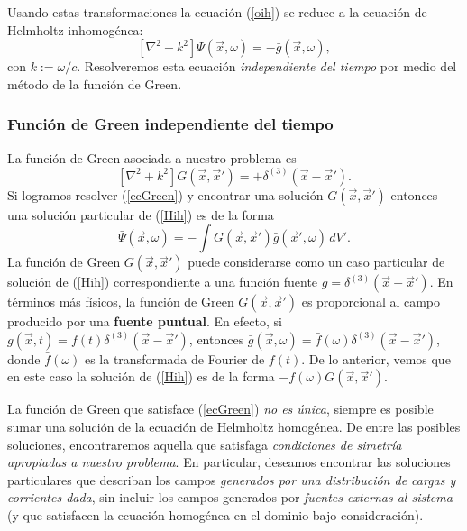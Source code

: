 Usando estas transformaciones la ecuación (\ref{oih}) se reduce a la ecuación de
Helmholtz inhomogénea:
\begin{equation}
\left[ \nabla^2+k^2\right] \bar{\Psi}(\vec{x},\omega)=-\bar{g}(\vec{x},\omega),
\label{Hih}
\end{equation}
con $k:=\omega/c$. Resolveremos esta ecuación \textit{independiente del tiempo} por medio del método de la función de Green.

\subsubsection{Función de Green independiente del tiempo}
La función de Green asociada a nuestro problema es
\begin{equation}
\left[ \nabla^2+k^2\right] G(\vec{x},\vec{x}')=+\delta^{(3)}(\vec{x}-\vec{x}').
\label{ecGreen}
\end{equation}
Si logramos resolver (\ref{ecGreen}) y encontrar una solución $G(\vec{x},\vec{x}')$ entonces una solución particular de (\ref{Hih}) es de la forma
\begin{equation}
\bar{\Psi}(\vec{x},\omega)=-\int G(\vec{x},\vec{x}')\bar{g}(\vec{x}',\omega)\,dV'.
\end{equation}
La función de Green $G(\vec{x},\vec{x}')$ puede considerarse como un caso particular de solución de (\ref{Hih}) correspondiente a una función fuente $\bar{g}=\delta^{(3)}(\vec{x}-\vec{x}')$. En términos más físicos, la función de Green $G(\vec{x},\vec{x}')$ es proporcional al campo producido por una \textbf{fuente puntual}. En efecto, si $g(\vec{x},t)=f(t)\delta^{(3)}(\vec{x}-\vec{x}')$, entonces $\bar{g}(\vec{x},\omega)=\bar{f}(\omega)\delta^{(3)}(\vec{x}-\vec{x}')$, donde $\bar{f}(\omega)$ es la transformada de Fourier de $f(t)$. De lo anterior, vemos que en este caso la solución de (\ref{Hih}) es de la forma $-\bar{f}(\omega)G(\vec{x},\vec{x}')$.

La función de Green que satisface (\ref{ecGreen}) \textit{no es única}, siempre es posible sumar una solución de la ecuación de Helmholtz homogénea. De entre las posibles soluciones, encontraremos aquella que satisfaga \textit{condiciones de simetría apropiadas a nuestro problema}. En particular, deseamos encontrar las soluciones particulares que describan los campos \textit{generados por una distribución de cargas y corrientes dada}, sin incluir los campos generados por \textit{fuentes externas al sistema} (y que satisfacen la ecuación homogénea en el dominio bajo consideración).

